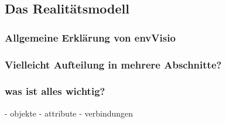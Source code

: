 \subsection{Das Realitätsmodell}
\label{sec:simplex-reality}
\subsubsection{Allgemeine Erklärung von envVisio}
\subsubsection{Vielleicht Aufteilung in mehrere Abschnitte?}
\subsubsection{was ist alles wichtig?}

- objekte
- attribute
- verbindungen
\parencite[4.2 Geradlinige Datenmodellierung]{grossmannFachsystemeSchemaevolution2024}
